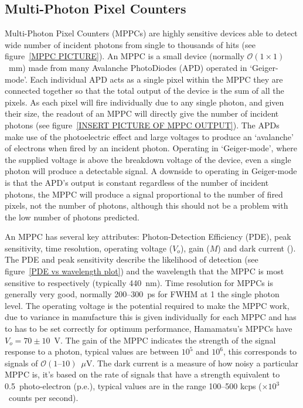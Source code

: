 \subsection{Multi-Photon Pixel Counters} %
\label{sub:multi_photon_pixel_counters}
Multi-Photon Pixel Counters (MPPCs) are highly sensitive devices able to detect wide number of incident photons from single to thousands of hits (see figure~\ref{MPPC PICTURE}). An MPPC is a small device (normally \( \mathcal{O}(1\times1) \)~mm) made from many Avalanche PhotoDiodes (APD) operated in `Geiger-mode'. Each individual APD acts as a single pixel within the MPPC they are connected together so that the total output of the device is the sum of all the pixels. As each pixel will fire individually due to any single photon, and given their size, the readout of an MPPC will directly give the number of incident photons (see figure~\ref{INSERT PICTURE OF MPPC OUTPUT}). The APDs make use of the photoelectric effect and large voltages to produce an `avalanche' of electrons when fired by an incident photon. Operating in `Geiger-mode', where the supplied voltage is above the breakdown voltage of the device, even a single photon will produce a detectable signal. A downside to operating in Geiger-mode is that the APD's output is constant regardless of the number of incident photons, the MPPC will produce a signal proportional to the number of fired pixels, not the number of photons, although this should not be a problem with the low number of photons predicted.

An MPPC has several key attributes: Photon-Detection Efficiency (PDE), peak sensitivity, time resolution, operating voltage (\( V_o \)), gain (\( M \)) and dark current (\(  \)). The PDE and peak sensitivity describe the likelihood of detection (see figure~\ref{PDE vs wavelength plot}) and the wavelength that the MPPC is most sensitive to respectively (typically 440~nm). Time resolution for MPPCs is generally very good, normally 200--300~ps for FWHM at 1 the single photon level. The operating voltage is the potential required to make the MPPC work, due to variance in manufacture this is given individually for each MPPC and has to has to be set correctly for optimum performance, Hamamatsu's MPPCs have \( V_o = 70\pm10 \)~V. The gain of the MPPC indicates the strength of the signal response to a photon, typical values are between \( 10^5 \) and \( 10^6 \), this corresponds to signals of \( \mathcal{O}(1\text{--}10) \)~\(\mu\)V. The dark current is a measure of how noisy a particular MPPC is, it's based on the rate of signals that have a strength equivalent to 0.5~photo-electron (p.e.), typical values are in the range 100--500 kcps (\( \times10^3 \)~counts per second).

